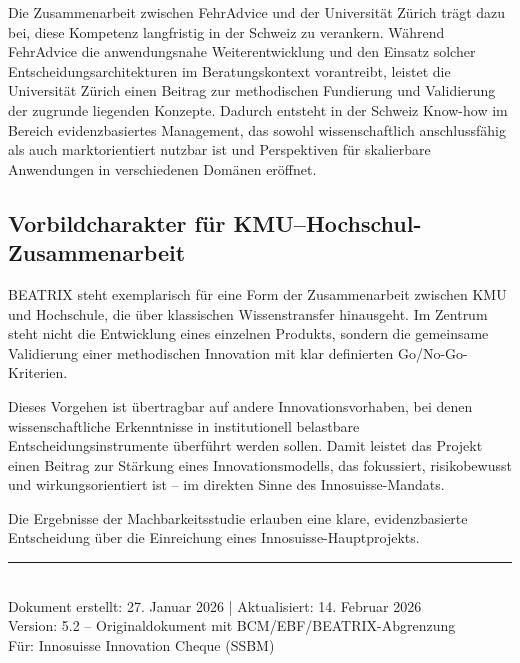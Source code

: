 \documentclass[11pt,a4paper]{article}
\begin{document}
Die Zusammenarbeit zwischen FehrAdvice und der Universität Zürich trägt dazu bei, diese Kompetenz langfristig in der Schweiz zu verankern. Während FehrAdvice die anwendungsnahe Weiterentwicklung und den Einsatz solcher Entscheidungsarchitekturen im Beratungskontext vorantreibt, leistet die Universität Zürich einen Beitrag zur methodischen Fundierung und Validierung der zugrunde liegenden Konzepte. Dadurch entsteht in der Schweiz Know-how im Bereich evidenzbasiertes Management, das sowohl wissenschaftlich anschlussfähig als auch marktorientiert nutzbar ist und Perspektiven für skalierbare Anwendungen in verschiedenen Domänen eröffnet.

\subsection{Vorbildcharakter für KMU--Hochschul-Zusammenarbeit}

BEATRIX steht exemplarisch für eine Form der Zusammenarbeit zwischen KMU und Hochschule, die über klassischen Wissenstransfer hinausgeht. Im Zentrum steht nicht die Entwicklung eines einzelnen Produkts, sondern die gemeinsame Validierung einer methodischen Innovation mit klar definierten Go/No-Go-Kriterien.

Dieses Vorgehen ist übertragbar auf andere Innovationsvorhaben, bei denen wissenschaftliche Erkenntnisse in institutionell belastbare Entscheidungsinstrumente überführt werden sollen. Damit leistet das Projekt einen Beitrag zur Stärkung eines Innovationsmodells, das fokussiert, risikobewusst und wirkungsorientiert ist -- im direkten Sinne des Innosuisse-Mandats.

Die Ergebnisse der Machbarkeitsstudie erlauben eine klare, evidenzbasierte Entscheidung über die Einreichung eines Innosuisse-Hauptprojekts.

\vspace{2cm}

\begin{center}
\rule{0.4\textwidth}{0.5pt}\\[0.5em]
{\small Dokument erstellt: 27. Januar 2026 | Aktualisiert: 14. Februar 2026}\\
{\small Version: 5.2 -- Originaldokument mit BCM/EBF/BEATRIX-Abgrenzung}\\
{\small Für: Innosuisse Innovation Cheque (SSBM)}
\end{center}
\end{document}
